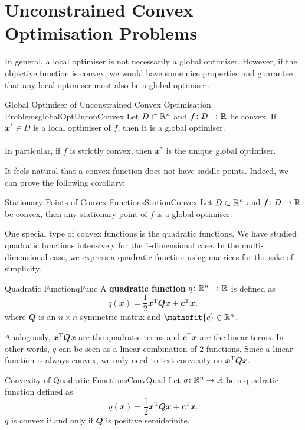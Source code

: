 \documentclass[math, code]{amznotes}
\theoremstyle{remark}
\begin{document}
\section{Unconstrained Convex Optimisation Problems}
In general, a local optimiser is not necessarily a global optimiser. However, if the objective function is convex, we would have some nice properties and guarantee that any local optimiser must also be a global optimiser.
\begin{thmbox}{\small Global Optimiser of Unconstrained Convex Optimisation Problems}{globalOptUnconConvex}
    Let $D \subset \mathbb{R}^n$ and $f \colon D \to \mathbb{R}$ be convex. If $\mathbfit{x}^* \in D$ is a local optimiser of $f$, then it is a global optimiser.
    \\\\
    In particular, if $f$ is strictly convex, then $\mathbfit{x}^*$ is the unique global optimiser. 
\end{thmbox}
It feels natural that a convex function does not have saddle points. Indeed, we can prove the following corollary:
\begin{corbox}{Stationary Points of Convex Functions}{StationConvex}
    Let $D \subset \mathbb{R}^n$ and $f \colon D \to \mathbb{R}$ be convex, then any stationary point of $f$ is a global optimiser.
\end{corbox}
One special type of convex functions is the quadratic functions. We have studied quadratic functions intensively for the $1$-dimensional case. In the multi-dimensional case, we express a quadratic function using matrices for the sake of simplicity.
\begin{dfnbox}{Quadratic Function}{qFunc}
    A {\color{red} \textbf{quadratic function}} $q \colon \mathbb{R}^n \to \mathbb{R}$ is defined as
    \begin{equation*}
        q(\mathbfit{x}) = \frac{1}{2}\mathbfit{x}^{\mathrm{T}}\mathbfit{Qx} + \mathbfit{c}^{\mathrm{T}}\mathbfit{x},
    \end{equation*}
    where $\mathbfit{Q}$ is an $n \times n$ symmetric matrix and $\mathbfit{c} \in \R^n$.
\end{dfnbox}
Analogously, $\mathbfit{x}^{\mathrm{T}}\mathbfit{Qx}$ are the quadratic terms and $\mathbfit{c}^{\mathrm{T}}\mathbfit{x}$ are the linear terms. In other words, $q$ can be seen as a linear combination of $2$ functions. Since a linear function is always convex, we only need to test convexity on $\mathbfit{x}^{\mathrm{T}}\mathbfit{Qx}$.
\begin{thmbox}{Convexity of Quadratic Functions}{ConvQuad}
    Let $q \colon \mathbb{R}^n \to \mathbb{R}$ be a quadratic function defined as
    \begin{equation*}
        q(\mathbfit{x}) = \frac{1}{2}\mathbfit{x}^{\mathrm{T}}\mathbfit{Qx} + \mathbfit{c}^{\mathrm{T}}\mathbfit{x}.
    \end{equation*}
    $q$ is convex if and only if $\mathbfit{Q}$ is positive semidefinite.
\end{thmbox}
\end{document}
